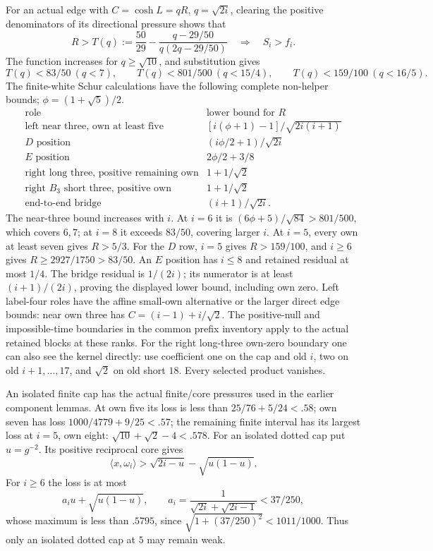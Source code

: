 \documentclass[11pt]{article}
\theoremstyle{definition}
\theoremstyle{remark}
\newcommand{\ip}[2]{\langle #1,#2\rangle}
\begin{document}
For an actual edge with \(C=\cosh L=qR\), \(q=\sqrt{2i}\),
clearing the positive denominators of its directional pressure
shows that
\[
 R>T(q):=\frac{50}{29}
    -\frac{q-29/50}{q(2q-29/50)}
 \quad\Longrightarrow\quad S_i>f_i.
\]
The function increases for \(q\geq\sqrt{10}\), and substitution gives
\[
 T(q)<83/50\ (q<7),\qquad
 T(q)<801/500\ (q<15/4),\qquad
 T(q)<159/100\ (q<16/5).
\]
The finite-white Schur calculations have the following complete
non-helper bounds; \(\phi=(1+\sqrt5)/2\).
\[
\begin{array}{c|l}
\text{role}&\text{lower bound for }R\\ \hline
\text{left near three, own at least five}
 &[i(\phi+1)-1]/\sqrt{2i(i+1)}\\
D\text{ position}&(i\phi/2+1)/\sqrt{2i}\\
E\text{ position}&2\phi/2+3/8\\
\text{right long three, positive remaining own}
 &1+1/\sqrt2\\
\text{right }B_3\text{ short three, positive own}
 &1+1/\sqrt2\\
\text{end-to-end bridge}&(i+1)/\sqrt{2i}.
\end{array}
\]
The near-three bound increases with \(i\). At \(i=6\) it is
\((6\phi+5)/\sqrt{84}>801/500\), which covers \(6,7\);
at \(i=8\) it exceeds \(83/50\), covering larger \(i\).
At \(i=5\), every own at least seven gives \(R>5/3\).
For the \(D\) row, \(i=5\) gives \(R>159/100\), and
\(i\geq6\) gives \(R\geq2927/1750>83/50\).
An \(E\) position has \(i\leq8\) and retained residual at most
\(1/4\). The bridge residual is \(1/(2i)\); its numerator is
at least \((i+1)/(2i)\), proving the displayed lower bound,
including own zero. Left label-four roles have the affine
small-own alternative or the larger direct edge bounds:
near own three has \(C=(i-1)+i/\sqrt2\).
The positive-null and impossible-time boundaries in the common
prefix inventory apply to the actual retained blocks at these
ranks. For the right long-three own-zero boundary one can also
see the kernel directly: use coefficient one on the cap and
old \(i\), two on old \(i+1,\ldots,17\), and \(\sqrt2\) on
old short \(18\). Every selected product vanishes.

An isolated finite cap has the actual finite/core pressures used
in the earlier component lemmas. At own five its loss is less than
\(25/76+5/24<.58\); own seven has loss
\(1000/4779+9/25<.57\); the remaining finite interval has its
largest loss at \(i=5\), own eight:
\(\sqrt{10}+\sqrt2-4<.578\).
For an isolated dotted cap put \(u=g^{-2}\). Its positive
reciprocal core gives
\[
 \ip x{\omega_i}>\sqrt{2i-u}-\sqrt{u(1-u)}.
\]
For \(i\geq6\) the loss is at most
\[
 a_i u+\sqrt{u(1-u)},\qquad
 a_i=\frac1{\sqrt{2i}+\sqrt{2i-1}}<37/250,
\]
whose maximum is less than \(.5795\), since
\(\sqrt{1+(37/250)^2}<1011/1000\).
Thus only an isolated dotted cap at \(5\) may remain weak.
\end{document}
